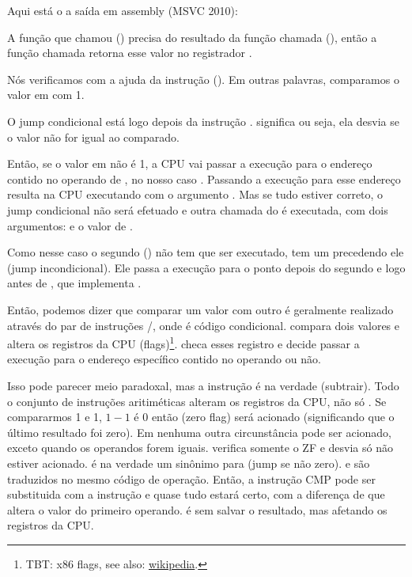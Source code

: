 
Aqui está o a saída em assembly (MSVC 2010):



A função que chamou (\main) precisa do resultado da função chamada (\scanf),
então a função chamada retorna esse valor no registrador \EAX.

Nós verificamos com a ajuda da instrução  (). Em outras palavras, comparamos o valor em \EAX com 1.

O jump condicional \JNE está logo depois da instrução \CMP. \JNE significa  ou seja, ela desvia se o valor não for igual ao comparado.

Então, se o valor em \EAX não é 1, a \ac{CPU} vai passar a execução para o endereço contido no operando de \JNE, no nosso caso .
Passando a execução para esse endereço resulta na \ac{CPU} executando \printf com o argumento .
Mas se tudo estiver correto, o jump condicional não será efetuado e outra chamada do \printf é executada, com dois argumentos:  e o valor de .

Como nesse caso o segundo \printf() não tem que ser executado, tem um \JMP precedendo ele (jump incondicional).
Ele passa a execução para o ponto depois do segundo \printf e logo antes de , que implementa .

Então, podemos dizer que comparar um valor com outro é geralmente realizado através do par de instruções \CMP/\Jcc, onde  é código condicional.
\CMP compara dois valores e altera os registros da \ac{CPU} (flags)\footnote{\ac{TBT}: x86 flags, see also: \href{http://go.yurichev.com/17120}{wikipedia}.}.
\Jcc checa esses registro e decide passar a execução para o endereço específico contido no operando ou não.

\label{CMPandSUB}
Isso pode parecer meio paradoxal, mas a instrução \CMP é na verdade \SUB (subtrair).
Todo o conjunto de instruções aritiméticas alteram os registros da \ac{CPU}, não só \CMP.
Se compararmos 1 e 1, $1-1$ é 0 então \ZF (zero flag) será acionado (significando que o último resultado foi zero).
Em nenhuma outra circunstância \ZF pode ser acionado, exceto quando os operandos forem iguais.
\JNE verifica somente o ZF e desvia só não estiver acionado.
\JNE é na verdade um sinônimo para \JNZ (jump se não zero).
\JNE e \JNZ são traduzidos no mesmo código de operação.
Então, a instrução CMP pode ser substituida com a instrução \SUB e quase tudo estará certo, com a diferença de que \SUB altera o valor do primeiro operando.
\CMP é \SUB sem salvar o resultado, mas afetando os registros da \ac{CPU}.

